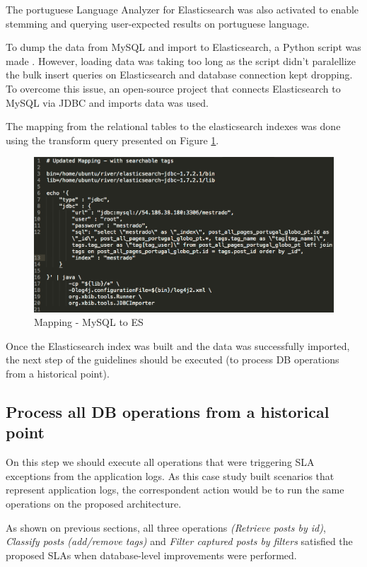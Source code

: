 The portuguese Language Analyzer \cite{eslanguageanalyzers} for Elasticsearch was also activated to enable stemming and querying user-expected results on portuguese language.

To dump the data from MySQL and import to Elasticsearch, a Python script was made \cite{mysqltoes}. However, loading data was taking too long as the script didn't paralellize the bulk insert queries on Elasticsearch and database connection kept dropping. To overcome this issue, an open-source project that connects Elasticsearch to MySQL via JDBC and imports data \cite{elasticjdbc} was used. 

The mapping from the relational tables to the elasticsearch indexes was done using the transform query presented on Figure \ref{fig:mysql-to-es}.

\begin{figure}[ht!]
	\centering
	\includegraphics[width=120mm]{Imagens/mysqlToES.png}
	\caption{Mapping - MySQL to ES \label{fig:mysql-to-es}}
\end{figure}

Once the Elasticsearch index was built and the data was successfully imported, the next step of the guidelines should be executed (to process DB operations from a historical point).


\subsection{Process all DB operations from a historical point}

On this step we should execute all operations that were triggering SLA exceptions from the application logs. As this case study built scenarios that represent application logs, the correspondent action would be to run the same operations on the proposed architecture. 

As shown on previous sections, all three operations \textit{(Retrieve posts by id)}, \textit{Classify posts (add/remove tags)} and \textit{Filter captured posts by filters}
satisfied the proposed SLAs when database-level improvements were performed. 

